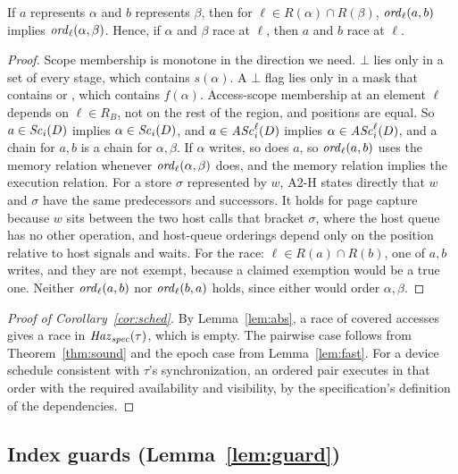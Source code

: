 \begin{lemma}[Abstraction]\label{lem:abs}
If $a$ represents $\alpha$ and $b$ represents $\beta$, then for $\ell \in R(\alpha) \cap R(\beta)$,
$\mathit{ord}_{\ell}(a,b)$ implies $\mathit{ord}_{\ell}(\alpha,\beta)$. Hence, if $\alpha$ and $\beta$ race at $\ell$, then $a$ and
$b$ race at $\ell$.
\end{lemma}
\begin{proof}
Scope membership is monotone in the direction we need. $\bot$ lies only in a set of every stage, which contains
$s(\alpha)$. A $\bot$ flag lies only in a mask that contains  or , which contains
$f(\alpha)$. Access-scope membership at an element $\ell$ depends on $\ell \in R_B$, not on the rest of the region, and
positions are equal. So $a \in \mathit{Sc}_{i}(D)$ implies $\alpha \in \mathit{Sc}_{i}(D)$, and $a \in \mathit{ASc}_{i}^{\ell}(D)$ implies
$\alpha \in \mathit{ASc}_{i}^{\ell}(D)$, and a chain for $a,b$ is a chain for $\alpha,\beta$. If $\alpha$ writes, so does $a$, so
$\mathit{ord}_{\ell}(a,b)$ uses the memory relation whenever $\mathit{ord}_{\ell}(\alpha,\beta)$ does, and the memory relation implies
the execution relation. For a store $\sigma$ represented by $w$, A2-H states directly that $w$ and $\sigma$ have the
same predecessors and successors. It holds for page capture because $w$ sits between the two host calls that
bracket $\sigma$, where the host queue has no other operation, and host-queue orderings depend only on the position
relative to host signals and waits. For the race: $\ell \in R(a) \cap R(b)$, one of $a,b$ writes, and they are not
exempt, because a claimed exemption would be a true one. Neither $\mathit{ord}_{\ell}(a,b)$ nor $\mathit{ord}_{\ell}(b,a)$ holds,
since either would order $\alpha,\beta$.
\end{proof}

\begin{proof}[Proof of Corollary~\ref{cor:sched}]
By Lemma~\ref{lem:abs}, a race of covered accesses gives a race in $\mathit{Haz}_{\mathit{spec}}(\tau)$, which is empty. The pairwise case
follows from Theorem~\ref{thm:sound} and the epoch case from Lemma~\ref{lem:fast}. For a device schedule consistent
with $\tau$'s synchronization, an ordered pair executes in that order with the required availability and visibility,
by the specification's definition of the dependencies.
\end{proof}

\subsection{Index guards (Lemma~\ref{lem:guard})}
\label{app:guard}

